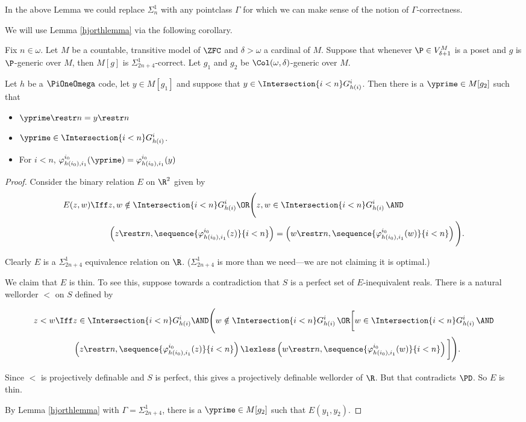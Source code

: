 \documentclass[oneside,12pt]{amsart}
\begin{document}
\begin{note} In the above Lemma we could replace $\Sigma^1_n$ with any
pointclass $\Gamma$ for which we can make sense of the notion of
$\Gamma$-correctness.
\end{note}

We will use Lemma \ref{hjorthlemma} via the following corollary.

\begin{corollary}
\label{hjorthcorollary} Fix $n\in\omega$.
Let $M$ be a countable, transitive model of $\ZFC$ and  $\delta>\omega$ a cardinal of $M$.
Suppose that whenever $\P\in V^M_{\delta+1}$ is a poset and $g$ is $\P$-generic over $M$, then
$M[g]$ is $\Sigma^1_{2n+4}$-correct. Let $g_1$ and $g_2$ be $\Col(\omega, \delta)$-generic over $M$.

Let $h$ be a $\PiOneOmega$ code, let $y\in M[g_1]$ and suppose that $y\in \Intersection{i<n} G^i_{h(i)}$. Then there is
a $\yprime \in M[g_2]$ such that
\begin{itemize}
\item $\yprime \restr n = y \restr n$
\item $\yprime\in \Intersection{i<n} G^i_{h(i)}$.
\item For $i<n$, $\varphi^{i_0}_{h(i_0),i_1}(\yprime) = \varphi^{i_0}_{h(i_0),i_1}(y)$
\end{itemize}
\end{corollary}
\begin{proof}
Consider the binary relation $E$ on $\R^2$ given by
\begin{align*}
E(z,w) \Iff &z,w\notin \Intersection{i<n} G^i_{h(i)} \OR \Bigg( z,w \in \Intersection{i<n} G^i_{h(i)} \, \AND  \\
&\left( z\restr n, \sequence{\varphi^{i_0}_{h(i_0),i_1}(z)}{i<n}\right) = \left( w\restr n, \sequence{\varphi^{i_0}_{h(i_0),i_1}(w)}{i<n}\right) \Bigg).
\end{align*}

Clearly $E$ is a $\Sigma^1_{2n+4}$ equivalence relation on $\R$. ($\Sigma^1_{2n+4}$ is more than we
need---we are not claiming it is optimal.)

We claim that $E$ is thin. To see this, suppose towards a contradiction that $S$ is a perfect set of $E$-inequivalent reals.
There is a natural wellorder $<$ on $S$ defined by

\begin{align*}
z<w \Iff &z\in \Intersection{i<n} G^i_{h(i)} \AND \Bigg( w \notin \Intersection{i<n} G^i_{h(i)} \, \OR   \bigg[w \in \Intersection{i<n} G^i_{h(i)} \, \AND\\
&\left( z\restr n, \sequence{\varphi^{i_0}_{h(i_0),i_1}(z)}{i<n}\right) \lexless \left( w\restr n, \sequence{\varphi^{i_0}_{h(i_0),i_1}(w)}{i<n}\right) \bigg]\Bigg).
\end{align*}

Since $<$ is projectively definable and $S$ is perfect, this gives a projectively definable wellorder of $\R$. But that
contradicts $\PD$. So $E$ is thin.

By Lemma \ref{hjorthlemma} with $\Gamma=\Sigma^1_{2n+4}$, there is a
$\yprime\in M[g_2]$ such that $E(y_1, y_2)$.
\end{proof}
\end{document}
